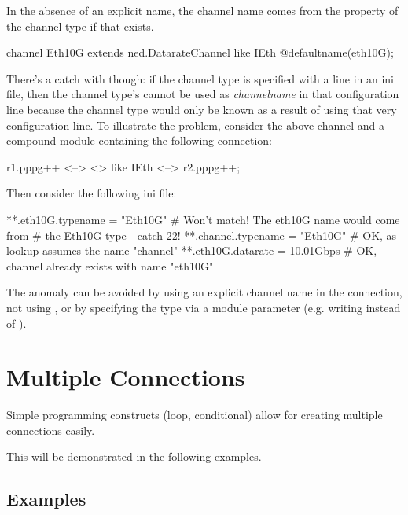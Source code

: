 In the absence of an explicit name, the channel name comes from the
 property of the channel type if that exists.

\begin{ned}
channel Eth10G extends ned.DatarateChannel like IEth {
    @defaultname(eth10G);
}
\end{ned}

There's a catch with  though: if the channel type is
specified with a  line in an ini file, then
the channel type's  cannot be used as \textit{channelname}
in that configuration line because the channel type would only be known as a
result of using that very configuration line. To illustrate the problem,
consider the above  channel and a compound module containing the
following connection:

\begin{ned}
r1.pppg++ <--> <> like IEth <--> r2.pppg++;
\end{ned}

Then consider the following ini file:

\begin{inifile}
**.eth10G.typename = "Eth10G"   # Won't match! The eth10G name would come from
                                #   the Eth10G type - catch-22!
**.channel.typename = "Eth10G"  # OK, as lookup assumes the name "channel"
**.eth10G.datarate = 10.01Gbps  # OK, channel already exists with name "eth10G"
\end{inifile}

The anomaly can be avoided by using an explicit channel name in the connection,
not using , or by specifying the type via a module parameter
(e.g. writing  instead of ).



\section{Multiple Connections}
\label{sec:ned-lang:multiple-connections}

Simple programming constructs (loop, conditional) allow for creating
multiple connections easily.


This will be demonstrated in the following examples.

\subsection{Examples}
\label{sec:ned-lang:multiple-connections-examples}

